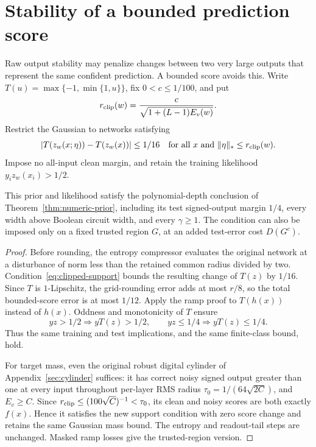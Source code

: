 \section{Stability of a bounded prediction score}
\label{sec:clipped-stability}

Raw output stability may penalize changes between two very large outputs
that represent the same confident prediction. A bounded score avoids this.
Write $T(u)=\max\{-1,\min\{1,u\}\}$, fix $0<c\le1/100$, and put
\[
 r_{\rm clip}(w)=\frac{c}{\sqrt{1+(L-1)E_v(w)}}.
\]
Restrict the Gaussian to networks satisfying
\begin{equation}\label{eq:clipped-support}
 |T(z_w(x;\eta))-T(z_w(x))|\le1/16
 \quad\text{for all }x\text{ and }\|\eta\|_*\le r_{\rm clip}(w).
\end{equation}
Impose no all-input clean margin, and retain the training likelihood
$y_i z_w(x_i)>1/2$.

\begin{corollary}
\label{cor:clipped-stability}
This prior and likelihood satisfy the polynomial-depth conclusion of
Theorem~\ref{thm:numeric-prior}, including its test signed-output margin
$1/4$, every width above Boolean circuit width, and every $\gamma\ge1$.
The condition can also be imposed only on a fixed trusted region $G$,
at an added test-error cost $D(G^c)$.
\end{corollary}
\begin{proof}
Before rounding, the entropy compressor evaluates the original network at
a disturbance of norm less than the retained common radius divided by two.
Condition~\eqref{eq:clipped-support} bounds the resulting change of $T(z)$
by $1/16$. Since $T$ is $1$-Lipschitz, the grid-rounding error adds at most
$r/8$, so the total bounded-score error is at most $1/12$.
Apply the ramp proof to $T(h(x))$ instead of $h(x)$.
Oddness and monotonicity of $T$ ensure
\[
 yz>1/2\Longrightarrow yT(z)>1/2,\qquad
 yz\le1/4\Longrightarrow yT(z)\le1/4.
\]
Thus the same training and test implications, and the same finite-class
bound, hold.

For target mass, even the original robust digital cylinder of
Appendix~\ref{sec:cylinder} suffices: it has correct noisy signed output greater
than one at every input throughout per-layer RMS radius
$\tau_0=1/(64\sqrt{2C})$, and $E_v\ge C$.
Since $r_{\rm clip}\le(100\sqrt C)^{-1}<\tau_0$, its clean and noisy
scores are both exactly $f(x)$. Hence it satisfies the new support
condition with zero score change and retains the same Gaussian mass bound.
The entropy and readout-tail steps are unchanged. Masked ramp losses give
the trusted-region version.
\end{proof}


